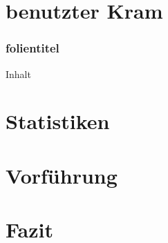 \documentclass[t]{beamer}
\begin{document}
\section{benutzter Kram}
\begin{frame}
\frametitle{folientitel}
Inhalt
\end{frame}
\section{Statistiken}
\section{Vorführung}
\section{Fazit}
\end{document}
